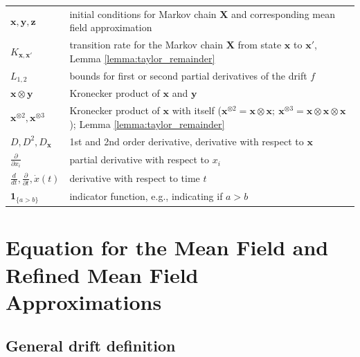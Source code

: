 \documentclass[acmsmall]{acmart}
\newcommand\bx{\mathbf{x}}
\newcommand\bX{\mathbf{X}}
\newcommand\by{\mathbf{y}}
\newcommand\bz{\mathbf{z}}
\newcommand\bdrift{f}
\begin{document}
\begin{center}
\begin{tabular}{l l}
$\bx, \by, \bz$ & initial conditions for Markov chain $\bX$ and corresponding mean field approximation \\
$K_{\bx,\bx'}$ & transition rate for the Markov chain $\bX$ from state $\bx$ to $\bx'$, Lemma \ref{lemma:taylor_remainder} \\
$L_{1, 2}$ & bounds for first or second partial derivatives of the drift $\bdrift$ \\
$ \bx \otimes\by $ & Kronecker product of $\bx$ and $\by$ \\
$\bx^{\otimes2}, \bx^{\otimes3}$ & Kronecker product of $\bx$ with itself ($\bx^{\otimes2} = \bx \otimes\bx; \  \bx^{\otimes3} = \bx \otimes\bx\otimes\bx$); Lemma \ref{lemma:taylor_remainder} \\
$D, D^2, D_{\bx}$ & 1st and 2nd order derivative, derivative with respect to $\bx$ \\
$ \frac{\partial }{\partial x_i} $ & partial derivative with respect to $x_i$ \\
$ \frac{d }{dt}, \frac{\partial }{\partial t}, \dot{x}(t)$ & derivative with respect to time $t$ \\
$ \mathbf{1}_{\{ a>b \}} $ & indicator function, e.g., indicating if $a>b$ \\
\end{tabular}
\end{center}


\section{Equation for the Mean Field and Refined Mean Field Approximations} 
\color{myorange}


\subsection{General drift definition}
\label{apx:drift_def}
\end{document}

